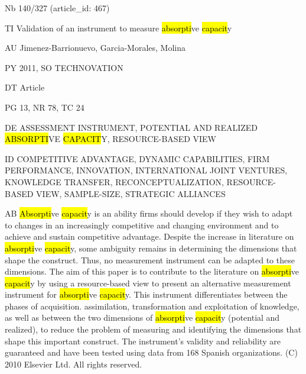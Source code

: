 \documentclass[a4paper]{article}
\begin{document}
\vspace*{-2cm}
Nb \tabto{0cm}140/327 (article\_id: 467)\par
TI \tabto{0cm}Validation of an instrument to measure \hl{absorpti}ve \hl{capacit}y\par
AU \tabto{0cm}Jimenez-Barrionuevo, Garcia-Morales, Molina\par
PY \tabto{0cm}2011, SO TECHNOVATION\par
DT \tabto{0cm}Article\par
PG \tabto{0cm}13, NR 78, TC 24\par
DE \tabto{0cm}ASSESSMENT INSTRUMENT, POTENTIAL AND REALIZED \hl{ABSORPTI}VE \hl{CAPACIT}Y, RESOURCE-BASED VIEW\par
ID \tabto{0cm}COMPETITIVE ADVANTAGE, DYNAMIC CAPABILITIES, FIRM PERFORMANCE, INNOVATION, INTERNATIONAL JOINT VENTURES, KNOWLEDGE TRANSFER, RECONCEPTUALIZATION, RESOURCE-BASED VIEW, SAMPLE-SIZE, STRATEGIC ALLIANCES\par
AB \tabto{0cm}\hl{Absorpti}ve \hl{capacit}y is an ability firms should develop if they wish to adapt to changes in an increasingly competitive and changing environment and to achieve and sustain competitive advantage. Despite the increase in literature on \hl{absorpti}ve \hl{capacit}y, some ambiguity remains in determining the dimensions that shape the construct. Thus, no measurement instrument can be adapted to these dimensions. The aim of this paper is to contribute to the literature on \hl{absorpti}ve \hl{capacit}y by using a resource-based view to present an alternative measurement instrument for \hl{absorpti}ve \hl{capacit}y. This instrument differentiates between the phases of acquisition. assimilation, transformation and exploitation of knowledge, as well as between the two dimensions of \hl{absorpti}ve \hl{capacit}y (potential and realized), to reduce the problem of measuring and identifying the dimensions that shape this important construct. The instrument's validity and reliability are guaranteed and have been tested using data from 168 Spanish organizations. (C) 2010 Elsevier Ltd. All rights reserved.\par
\clearpage
\end{document}

